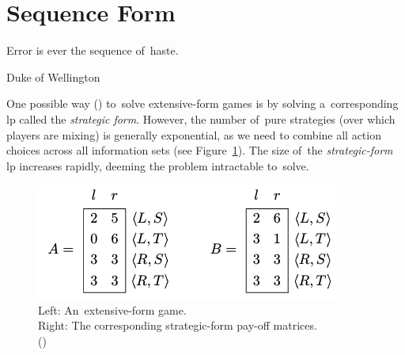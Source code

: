 \section{Sequence Form}
{
  \setlength{\epigraphwidth}{0.65\textwidth}
  \epigraph{
    Error is ever the sequence of~haste.
  }{Duke of Wellington}
}%
One possible way (\cite[pp.~73--74]{AGT07}) to~solve extensive-form games is by solving a~corresponding \acrfull{lp} called the \emph{strategic form}.
However, the number of~pure strategies (over which players are mixing) is generally exponential, as we need to combine all action choices across all information sets (see Figure~\ref{fig:strategic-form}).
The size of~the \emph{strategic-form} \acrshort{lp} increases rapidly, deeming the problem intractable to~solve.
\begin{figure}[H]
  \centering
  \tiny
  \def\svgwidth{.5\textwidth}
  
  \includegraphics[width=.4\textwidth]{../img/strategic-form.png}
  \def\captionTitle{Left: An~extensive-form game. \\Right: The corresponding strategic-form pay-off matrices.}
  \caption[The strategic-form pay-off matrices]{\captionTitle{} \\(\cite[p.~67]{AGT07})}
  \label{fig:strategic-form}
\end{figure}

